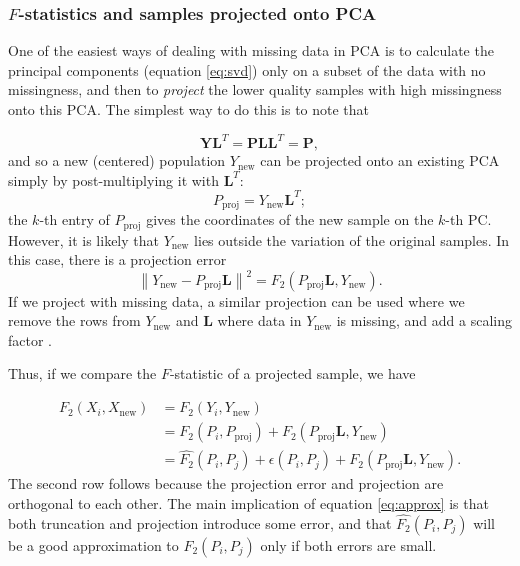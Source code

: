 \documentclass[12pt,fullpage, a4paper]{article}
\newcommand{\normsq}[1]{\left\lVert#1\right\rVert^2}
\newcommand{\MY}{\mathbf{Y}} %
\newcommand{\MP}{\mathbf{P}} %
\newcommand{\ML}{\mathbf{L}} %
\newcommand{\MSINGULAR}{\mathbf{\Sigma}} %
\begin{document}
\subsubsection{$F$-statistics and samples projected onto PCA}
One of the easiest ways of dealing with missing data in PCA is to calculate the principal components (equation \ref{eq:svd}) only on a subset of the data with no missingness, and then to \emph{project} the lower quality samples with high missingness onto this PCA. The simplest way to do this is to note that

\begin{equation*}
\MY\ML^T = \MP\ML\ML^T = \MP,
\end{equation*}
and so a new (centered) population $Y_{\text{new}}$ can be projected onto an existing PCA simply by post-multiplying it with $\ML^T$: $$P_{\text{proj}} = Y_{\text{new}}\ML^T;$$ the $k$-th entry of $P_{\text{proj}}$ gives the coordinates of the new sample on the $k$-th PC. However, it is likely that $Y_{\text{new}}$ lies outside the variation of the original samples. In this case, there is a projection error 
$$\normsq{Y_{\text{new}} - P_{\text{proj}}\ML } =  F_2(P_{\text{proj}}\ML, Y_{\text{new}}).$$ If we project with missing data, a similar projection can be used where we remove the rows from $Y_{\text{new}}$ and $\ML$ where data in $Y_{\text{new}}$ is missing, and add a scaling factor \citep{patterson2006}.




Thus, if we compare the $F$-statistic of a projected sample, we have 

\begin{align}
F_2(X_i, X_{\text{new}}) &= F_2(Y_i, Y_{\text{new}})\nonumber\\ 
&= F_2(P_i, P_{\text{proj}}) + F_2(P_{\text{proj}}\ML, Y_{\text{new}})\nonumber\\
&= \hat{F_2}(P_i, P_j) + {\epsilon(P_i, P_j)} + F_2(P_{\text{proj}}\ML, Y_{\text{new}}) \label{eq:approx}.
\end{align}
The second row follows because the projection error and projection are orthogonal to each other. The main implication of equation \ref{eq:approx} is that both truncation and projection introduce some error, and that $ \hat{F_2}(P_i, P_j)$ will be a good approximation to  $F_2(P_i, P_j)$ only if both errors are small.
\end{document}
